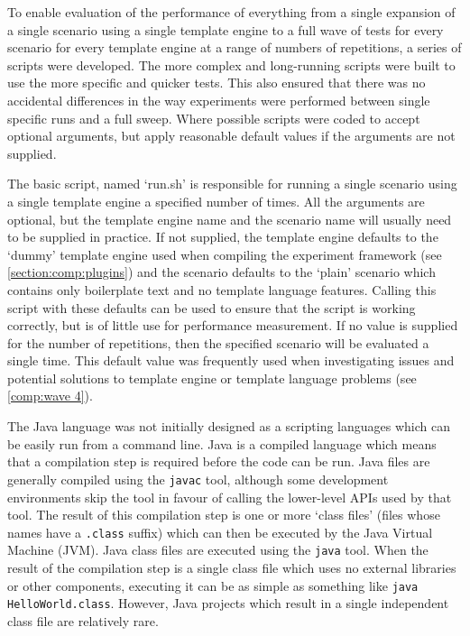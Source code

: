 To enable evaluation of the performance of everything from a single expansion of a single scenario using a single template engine to a full wave of tests for every scenario for every template engine at a range of numbers of repetitions, a series of scripts were developed. The more complex and long-running scripts were built to use the more specific and quicker tests. This also ensured that there was no accidental differences in the way experiments were performed between single specific runs and a full sweep. Where possible scripts were coded to accept optional arguments, but apply reasonable default values if the arguments are not supplied.

The basic script, named `run.sh' is responsible for running a single scenario using a single template engine a specified number of times. All the arguments are optional, but the template engine name and the scenario name will usually need to be supplied in practice. If not supplied, the template engine defaults to the `dummy' template engine used when compiling the experiment framework (see \autoref{section:comp:plugins}) and the scenario defaults to the `plain' scenario which contains only boilerplate text and no template language features. Calling this script with these defaults can be used to ensure that the script is working correctly, but is of little use for performance measurement. If no value is supplied for the number of repetitions, then the specified scenario will be evaluated a single time. This default value was frequently used when investigating issues and potential solutions to template engine or template language problems (see \autoref{comp:wave 4}).

The Java language was not initially designed as a scripting languages which can be easily run from a command line. Java is a compiled language which means that a compilation step is required before the code can be run. Java files are generally compiled using the \verb!javac! tool, although some development environments skip the tool in favour of calling the lower-level APIs used by that tool. The result of this compilation step is one or more `class files' (files whose names have a \verb!.class! suffix) which can then be executed by the Java Virtual Machine (JVM). Java class files are executed using the \verb!java! tool. When the result of the compilation step is a single class file which uses no external libraries or other components, executing it can be as simple as something like \verb!java HelloWorld.class!. However, Java projects which result in a single independent class file are relatively rare.


